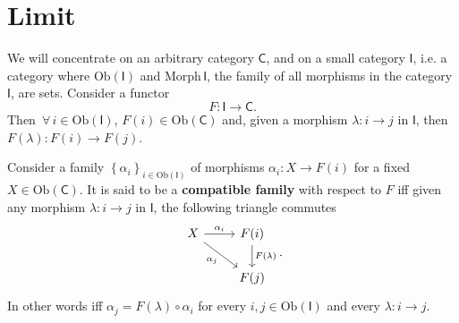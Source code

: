 \section{Limit}
We will concentrate on an arbitrary category $\mathsf{C}$,
and on a small category $\mathsf{I}$,
i.e. a category where $\mathrm{Ob} \left(\mathsf{I}\right)$ and $\mathrm{Morph}\, \mathsf{I}$,
the family of all morphisms in the category $\mathsf{I}$, are sets.
Consider a functor 
\begin{equation}
F: \mathsf{I} \to \mathsf{C}
.\end{equation} 
Then $\,\forall\, i \in \mathrm{Ob} \left(\mathsf{I}\right)$, $F(i) \in \mathrm{Ob} \left(\mathsf{C}\right)$ and,
given a morphism $\lambda: i \to j$ in $\mathsf{I}$, then $F(\lambda): F(i) \to F(j)$.

\begin{defn}
	Consider a family $\left\{ \alpha_i \right\}_{i \in \mathrm{Ob} \left(\mathsf{I}\right)}$ of morphisms 
	$\alpha_i: X \to F(i)$ for a fixed $X \in \mathrm{Ob} \left(\mathsf{C}\right)$.
	It is said to be a \textbf{compatible family} with respect to $F$ iff
	given any morphism $\lambda: i \to j$ in $\mathsf{I}$, the following triangle commutes
	\begin{equation}
	\begin{tikzcd}
		X \arrow[r, "\alpha_i", rightarrow] \arrow[rd, "\alpha_j"', rightarrow] &
		F(i) \arrow[d, "F(\lambda)", rightarrow] \\
		&
		F(j)
	\end{tikzcd}
	.\end{equation} 
	In other words iff $\alpha_j = F(\lambda) \circ \alpha_i$ for every $i, j \in \mathrm{Ob} \left(\mathsf{I}\right)$ and every $\lambda: i \to j$.
\end{defn}

